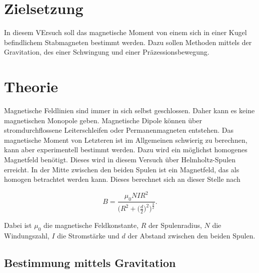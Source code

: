 \section{Zielsetzung}
In diesem VErsuch soll das magnetische Moment von einem sich in einer Kugel befindlichem Stabmagneten bestimmt werden.
Dazu sollen Methoden mittels der Gravitation, des einer Schwingung und einer Präzessionsbewegung.

\section{Theorie}
\label{sec:Theorie}

Magnetische Feldlinien sind immer in sich selbst geschlossen. Daher kann es keine magnetischen Monopole geben.
Magnetische Dipole können über stromdurchflossene Leiterschleifen oder Permanenmagneten entstehen. Das magnetische Moment von Letzteren ist im Allgemeinen schwierig zu berechnen, kann aber experimentell bestimmt werden.
Dazu wird ein möglichst homogenes Magnetfeld benötigt. Dieses wird in diesem Versuch über Helmholtz-Spulen erreicht.
In der Mitte zwischen den beiden Spulen ist ein Magnetfeld, das als homogen betrachtet werden kann. 
Dieses berechnet sich an dieser Stelle nach

\begin{equation}
    \label{eqn:helmholtz}
    B = \frac{\mu_0 N I R^2}{\big(R^2 + \Big( \frac{d}{2} \Big)^2 \Big)^{\frac{3}{2}}}.
\end{equation}

Dabei ist $\mu_0$ die magnetische Feldkonstante, $R$ der Spulenradius, $N$ die Windungszahl, $I$ die Stromstärke und $d$ der Abstand zwischen den beiden Spulen.


\subsection{Bestimmung mittels Gravitation}

